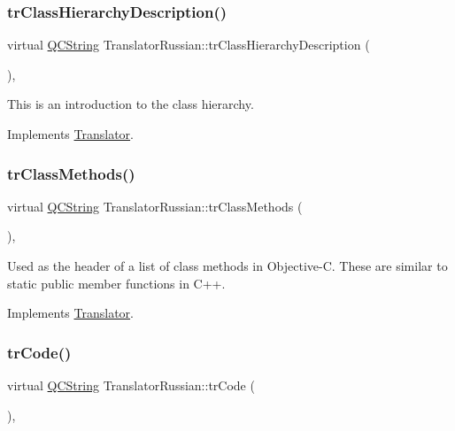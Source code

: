 \subsubsection{\texorpdfstring{trClassHierarchyDescription()}{trClassHierarchyDescription()}}
{\footnotesize\ttfamily virtual \mbox{\hyperlink{class_q_c_string}{Q\+C\+String}} Translator\+Russian\+::tr\+Class\+Hierarchy\+Description (\begin{DoxyParamCaption}{ }\end{DoxyParamCaption})\hspace{0.3cm}{\ttfamily [inline]}, {\ttfamily [virtual]}}

This is an introduction to the class hierarchy. 

Implements \mbox{\hyperlink{class_translator}{Translator}}.

\mbox{\label{class_translator_russian_aec2ea613951f926d582b20ff07ca155d}} 
\subsubsection{\texorpdfstring{trClassMethods()}{trClassMethods()}}
{\footnotesize\ttfamily virtual \mbox{\hyperlink{class_q_c_string}{Q\+C\+String}} Translator\+Russian\+::tr\+Class\+Methods (\begin{DoxyParamCaption}{ }\end{DoxyParamCaption})\hspace{0.3cm}{\ttfamily [inline]}, {\ttfamily [virtual]}}

Used as the header of a list of class methods in Objective-\/C. These are similar to static public member functions in C++. 

Implements \mbox{\hyperlink{class_translator}{Translator}}.

\mbox{\label{class_translator_russian_aa51338503dcdd0c59a2c86bc8e6e9eef}} 
\subsubsection{\texorpdfstring{trCode()}{trCode()}}
{\footnotesize\ttfamily virtual \mbox{\hyperlink{class_q_c_string}{Q\+C\+String}} Translator\+Russian\+::tr\+Code (\begin{DoxyParamCaption}{ }\end{DoxyParamCaption})\hspace{0.3cm}{\ttfamily [inline]}, {\ttfamily [virtual]}}

